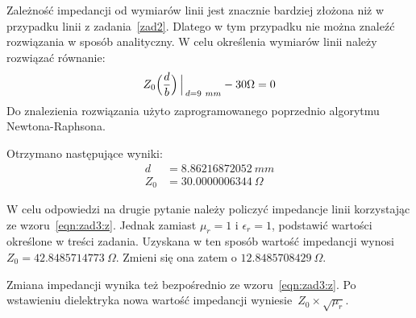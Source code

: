 \documentclass[rep.tex]{subfiles}
\begin{document}
Zależność impedancji od wymiarów linii jest znacznie bardziej złożona niż w przypadku linii z zadania~\ref{zad2}.
Dlatego w tym przypadku nie można znaleźć rozwiązania w sposób analityczny.
W celu określenia wymiarów linii należy rozwiązać równanie:
\begin{equation}
  Z_0\Big(\frac{d}{b}\Big)\Big\arrowvert_{d=9~mm} - 30 \Omega = 0
  \label{eqn:zad3:eq}
\end{equation}
Do znalezienia rozwiązania użyto zaprogramowanego poprzednio algorytmu Newtona-Raphsona.

Otrzymano następujące wyniki:
\begin{align}
  d   &= 8.86216872052~mm \\
  Z_0 &= 30.0000006344~\Omega
\end{align}

W celu odpowiedzi na drugie pytanie należy policzyć impedancje linii korzystając ze wzoru~\ref{eqn:zad3:z}.
Jednak zamiast $\mu_r = 1$ i $\epsilon_r = 1$, podstawić wartości określone w treści zadania.
Uzyskana w ten sposób wartość impedancji wynosi $Z_0 = 42.8485714773~\Omega$.
Zmieni się ona zatem o $12.8485708429~\Omega$.

Zmiana impedancji wynika też bezpośrednio ze wzoru~\ref{eqn:zad3:z}.
Po wstawieniu dielektryka nowa wartość impedancji wyniesie~$Z_0 \times \sqrt{\mu_r}$.
\end{document}
